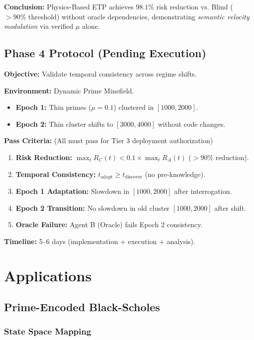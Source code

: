 \documentclass[12pt,a4paper]{article}
\begin{document}
\textbf{Conclusion:} Physics-Based ETP achieves $98.1\%$ risk reduction vs. Blind ($>90\%$ threshold) without oracle dependencies, demonstrating \textit{semantic velocity modulation} via verified $\mu$ alone.

\subsection{Phase 4 Protocol (Pending Execution)}

\textbf{Objective:} Validate temporal consistency across regime shifts.

\textbf{Environment:} Dynamic Prime Minefield.
\begin{itemize}
\item \textbf{Epoch 1:} Thin primes ($\mu = 0.1$) clustered in $[1000, 2000]$.
\item \textbf{Epoch 2:} Thin cluster shifts to $[3000, 4000]$ without code changes.
\end{itemize}

\textbf{Pass Criteria:} (All must pass for Tier 3 deployment authorization)
\begin{enumerate}
\item \textbf{Risk Reduction:} $\max_t R_C(t) < 0.1 \times \max_t R_A(t)$ ($>90\%$ reduction).
\item \textbf{Temporal Consistency:} $t_{\text{adapt}} \ge t_{\text{discover}}$ (no pre-knowledge).
\item \textbf{Epoch 1 Adaptation:} Slowdown in $[1000, 2000]$ after interrogation.
\item \textbf{Epoch 2 Transition:} No slowdown in old cluster $[1000, 2000]$ after shift.
\item \textbf{Oracle Failure:} Agent B (Oracle) fails Epoch 2 consistency.
\end{enumerate}

\textbf{Timeline:} 5--6 days (implementation + execution + analysis).

\section{Applications}
\label{sec:applications}

\subsection{Prime-Encoded Black-Scholes}

\subsubsection{State Space Mapping}
\end{document}
